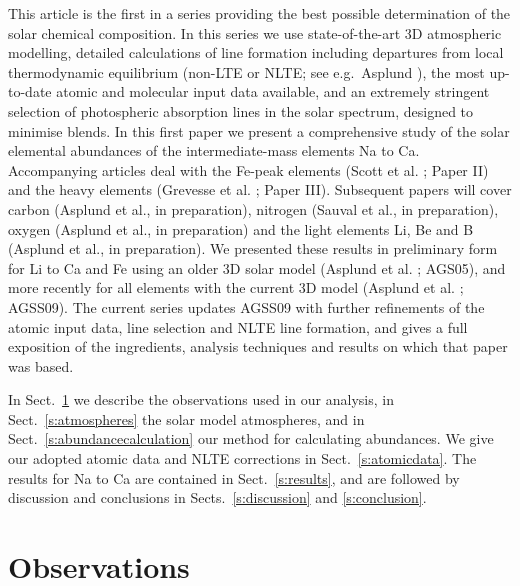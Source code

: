 \documentclass[traditabstract]{aa}
\begin{document}
This article is the first in a series providing the best possible determination of the solar chemical composition.  In this series we use state-of-the-art 3D atmospheric modelling, detailed calculations of line formation including departures from local thermodynamic equilibrium (non-LTE or NLTE; see e.g.\ Asplund \cite{asp7}), the most up-to-date atomic and molecular input data available, and an extremely stringent selection of photospheric absorption lines in the solar spectrum, designed to minimise blends.  In this first paper we present a comprehensive study of the solar elemental abundances of the intermediate-mass elements Na to Ca.  Accompanying articles deal with the Fe-peak elements (Scott et al. \cite{AGSS_Fegroup}; Paper II) and the heavy elements (Grevesse et al. \cite{AGSS_heavy}; Paper III). Subsequent papers will cover carbon (Asplund et al., in preparation), nitrogen (Sauval et al., in preparation), oxygen (Asplund et al., in preparation) and the light elements Li, Be and B (Asplund et al., in preparation). We presented these results in preliminary form for Li to Ca and Fe using an older 3D solar model (Asplund et al. \cite{AGS05}; AGS05), and more recently for all elements with the current 3D model (Asplund et al. \cite{asp8}; AGSS09).  The current series updates AGSS09 with further refinements of the atomic input data, line selection and NLTE line formation, and gives a full exposition of the ingredients, analysis techniques and results on which that paper was based. 

In Sect.\ \ref{s:observations} we describe the observations used in our analysis, in Sect.\ \ref{s:atmospheres} the solar model atmospheres, and in Sect.\ \ref{s:abundancecalculation} our method for calculating abundances.  We give our adopted atomic data and NLTE corrections in Sect.\ \ref{s:atomicdata}.  The results for Na to Ca are contained in Sect.\ \ref{s:results}, and are followed by discussion and conclusions in Sects.\ \ref{s:discussion} and \ref{s:conclusion}.

\section{Observations}
\label{s:observations}
\end{document}

